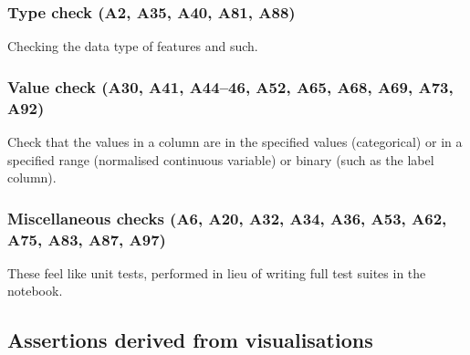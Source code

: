 \subsubsection{Type check (A2, A35, A40, A81, A88)}

Checking the data type of features and such.

\subsubsection{Value check (A30, A41, A44--46, A52, A65, A68, A69, A73, A92)}

Check that the values in a column are in the specified values (categorical) or in a specified range (normalised continuous variable) or binary (such as the label column).

\subsubsection{Miscellaneous checks (A6, A20, A32, A34, A36, A53, A62, A75, A83, A87, A97)}

These feel like unit tests, performed in lieu of writing full test suites in the notebook.



%
%



\subsection{Assertions derived from visualisations}


